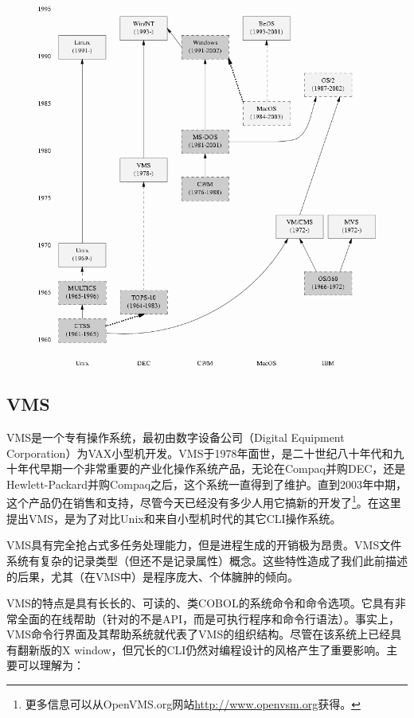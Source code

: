 \documentclass[12pt,oneside]{book}
\begin{document}
\begin{figure}[H]
\centering
\includegraphics[width=\linewidth ,totalheight=0.95\textheight , keepaspectratio]{fen-shi-xi-tong.png}
\end{figure}


\subsection{VMS}
VMS是一个专有操作系统，最初由数字设备公司（Digital Equipment Corporation）为VAX小型机开发。VMS于1978年面世，是二十世纪八十年代和九十年代早期一个非常重要的产业化操作系统产品，无论在Compaq并购DEC，还是Hewlett-Packard并购Compaq之后，这个系统一直得到了维护。直到2003年中期，这个产品仍在销售和支持，尽管今天已经没有多少人用它搞新的开发了\footnote{更多信息可以从OpenVMS.org网站\href{http://www.openvsm.org}{http://www.openvsm.org}获得。}。在这里提出VMS，是为了对比Unix和来自小型机时代的其它CLI操作系统。

VMS具有完全抢占式多任务处理能力，但是进程生成的开销极为昂贵。VMS文件系统有复杂的记录类型（但还不是记录属性）概念。这些特性造成了我们此前描述的后果，尤其（在VMS中）是程序庞大、个体臃肿的倾向。

VMS的特点是具有长长的、可读的、类COBOL的系统命令和命令选项。它具有非常全面的在线帮助（针对的不是API，而是可执行程序和命令行语法）。事实上，VMS命令行界面及其帮助系统就代表了VMS的组织结构。尽管在该系统上已经具有翻新版的X window，但冗长的CLI仍然对编程设计的风格产生了重要影响。主要可以理解为：
\end{document}
